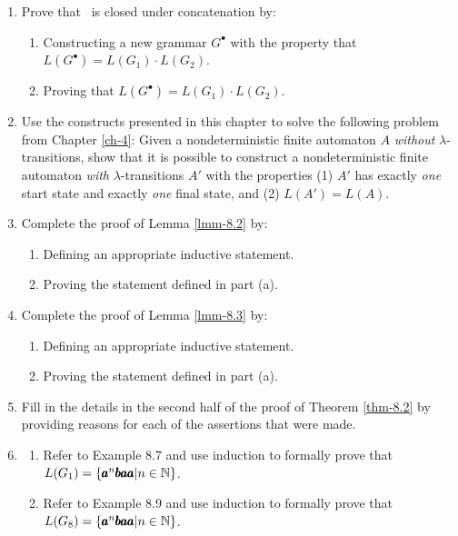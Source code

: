 \begin{enumerate}[{8.}1. ]
\item Prove that \GSIG\ is closed under concatenation by:
\begin{enumerate}
\item Constructing a new grammar $G^\bullet$ with the property that $L(G^\bullet)=L(G_1)
\cdot L(G_2)$.
\item Proving that $L(G^\bullet)=L(G_1)\cdot L(G_2)$.
\end{enumerate}

\item Use the constructs presented in this chapter to solve the following
problem from Chapter \ref{ch-4}: Given a nondeterministic finite automaton $A$
\emph{without} $\lambda$-transitions, show that it is possible to construct a
nondeterministic finite automaton \emph{with} $\lambda$-transitions $A'$ with
the properties (1) $A'$ has exactly \emph{one} start state and exactly \emph{one}
final state, and (2) $L(A')=L(A)$.

\item Complete the proof of Lemma \ref{lmm-8.2} by:
\begin{enumerate}
\item Defining an appropriate inductive statement.
\item Proving the statement defined in part (a).
\end{enumerate}

\item Complete the proof of Lemma \ref{lmm-8.3} by:
\begin{enumerate}
\item Defining an appropriate inductive statement.
\item Proving the statement defined in part (a).
\end{enumerate}

\item Fill in the details in the second half of the proof of Theorem \ref{thm-8.2} by
providing reasons for each of the assertions that were made.

\item \begin{enumerate}
\item Refer to Example 8.7 and use induction to formally prove that $L(G_1) =
\{\pmb{a}^n\pmb{baa}|n\in\mathbb{N}\}$.
\item Refer to Example 8.9 and use induction to formally prove that $L(G_8) =
\{\pmb{a}^n\pmb{baa}|n\in\mathbb{N}\}$.
\end{enumerate}


\end{enumerate}
